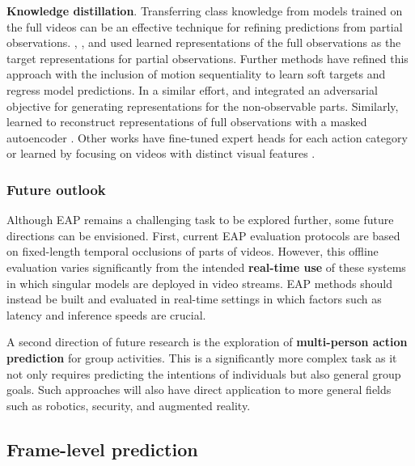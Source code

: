 \noindent
\textbf{Knowledge distillation}. Transferring class knowledge \citep{park2019relational} from models trained on the full videos can be an effective technique for refining predictions from partial observations. \citet{cai2019action}, \citet{fernando2021anticipating}, and \citet{wang2019progressive} used learned representations of the full observations as the target representations for partial observations. Further methods \citep{hou2020confidence} have refined this approach with the inclusion of motion sequentiality to learn soft targets and regress model predictions. In a similar effort, \citep{xu2019prediction} and \citep{zheng2023egocentric} integrated an adversarial objective for generating representations for the non-observable parts. Similarly, \citet{xu2023dynamic} learned to reconstruct representations of full observations with a masked autoencoder \citep{he2022masked}. Other works have fine-tuned expert heads for each action category \citep{foo2022era} or learned by focusing on videos with distinct visual features \citep{hu2018early}.


\subsubsection{Future outlook}

Although EAP remains a challenging task to be explored further, some future directions can be envisioned. First, current EAP evaluation protocols are based on fixed-length temporal occlusions of parts of videos. However, this offline evaluation varies significantly from the intended \textbf{real-time use} of these systems in which singular models are deployed in video streams. EAP methods should instead be built and evaluated in real-time settings in which factors such as latency and inference speeds are crucial.

A second direction of future research is the exploration of \textbf{multi-person action prediction} for group activities. This is a significantly more complex task as it not only requires predicting the intentions of individuals but also general group goals. Such approaches will also have direct application to more general fields such as robotics, security, and augmented reality. 







\subsection{Frame-level prediction}
\label{sec:prediction::VFP}

